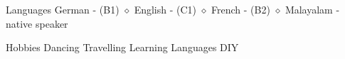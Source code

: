 \documentclass{resume} %
\begin{document}
	\vspace{2mm}
	
	
	\begin{rSection}{Languages}
	German -  (B1)  \quad $\diamond$   English - (C1)   \quad $\diamond$ French - (B2)  \quad $\diamond$ Malayalam - native speaker \\
	\end{rSection}

	\begin{rSection}{Hobbies}
		Dancing \quad Travelling \quad Learning Languages \quad DIY
		
	\end{rSection}
	
\end{document}
